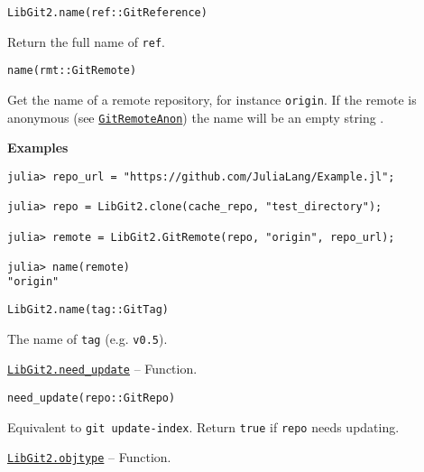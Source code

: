 \begin{adjustwidth}{2em}{0pt}


\begin{verbatim}
LibGit2.name(ref::GitReference)
\end{verbatim}

Return the full name of \texttt{ref}.




\begin{lstlisting}
name(rmt::GitRemote)
\end{lstlisting}

Get the name of a remote repository, for instance \texttt{{\textquotedbl}origin{\textquotedbl}}. If the remote is anonymous (see \hyperlink{13915605113589562056}{\texttt{GitRemoteAnon}}) the name will be an empty string \texttt{{\textquotedbl}{\textquotedbl}}.

\textbf{Examples}


\begin{verbatim}
julia> repo_url = "https://github.com/JuliaLang/Example.jl";

julia> repo = LibGit2.clone(cache_repo, "test_directory");

julia> remote = LibGit2.GitRemote(repo, "origin", repo_url);

julia> name(remote)
"origin"
\end{verbatim}




\begin{lstlisting}
LibGit2.name(tag::GitTag)
\end{lstlisting}

The name of \texttt{tag} (e.g. \texttt{{\textquotedbl}v0.5{\textquotedbl}}).



\end{adjustwidth}
\hypertarget{7748563965577890862}{}
\hyperlink{7748563965577890862}{\texttt{LibGit2.need\_update}}  -- {Function.}

\begin{adjustwidth}{2em}{0pt}


\begin{verbatim}
need_update(repo::GitRepo)
\end{verbatim}

Equivalent to \texttt{git update-index}. Return \texttt{true} if \texttt{repo} needs updating.



\end{adjustwidth}
\hypertarget{5024227788763319693}{}
\hyperlink{5024227788763319693}{\texttt{LibGit2.objtype}}  -- {Function.}

